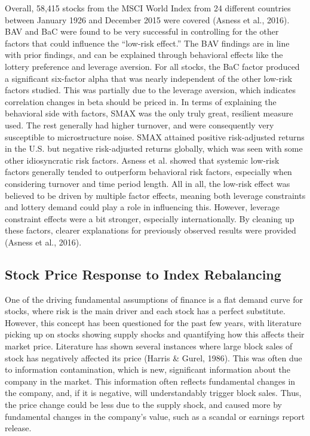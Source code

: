 \documentclass[12pt,twoside]{reedthesis}
\theoremstyle{definition}
\theoremstyle{definition}
\theoremstyle{definition}
\theoremstyle{remark}
\begin{document}
Overall, 58,415 stocks from the MSCI World Index from 24 different
countries between January 1926 and December 2015 were covered (Asness et
al., 2016). BAV and BaC were found to be very successful in controlling
for the other factors that could influence the ``low-risk effect.'' The
BAV findings are in line with prior findings, and can be explained
through behavioral effects like the lottery preference and leverage
aversion. For all stocks, the BaC factor produced a significant
six-factor alpha that was nearly independent of the other low-risk
factors studied. This was partially due to the leverage aversion, which
indicates correlation changes in beta should be priced in. In terms of
explaining the behavioral side with factors, SMAX was the only truly
great, resilient measure used. The rest generally had higher turnover,
and were consequently very susceptible to microstructure noise. SMAX
attained positive risk-adjusted returns in the U.S. but negative
risk-adjusted returns globally, which was seen with some other
idiosyncratic risk factors. Asness et al. showed that systemic low-risk
factors generally tended to outperform behavioral risk factors,
especially when considering turnover and time period length. All in all,
the low-risk effect was believed to be driven by multiple factor
effects, meaning both leverage constraints and lottery demand could play
a role in influencing this. However, leverage constraint effects were a
bit stronger, especially internationally. By cleaning up these factors,
clearer explanations for previously observed results were provided
(Asness et al., 2016).

\subsection{Stock Price Response to Index
Rebalancing}\label{stock-price-response-to-index-rebalancing}

One of the driving fundamental assumptions of finance is a flat demand
curve for stocks, where risk is the main driver and each stock has a
perfect substitute. However, this concept has been questioned for the
past few years, with literature picking up on stocks showing supply
shocks and quantifying how this affects their market price. Literature
has shown several instances where large block sales of stock has
negatively affected its price (Harris \& Gurel, 1986). This was often
due to information contamination, which is new, significant information
about the company in the market. This information often reflects
fundamental changes in the company, and, if it is negative, will
understandably trigger block sales. Thus, the price change could be less
due to the supply shock, and caused more by fundamental changes in the
company's value, such as a scandal or earnings report release.
\end{document}
